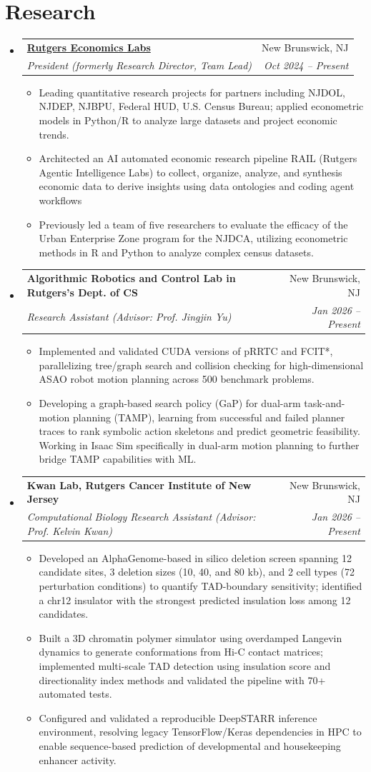 \documentclass[letterpaper,11pt]{article}
\makeatletter
\newcommand{\resumeItem}[1]{
  \item\small{
    {#1 \vspace{-2pt}}
  }
}
\newcommand{\resumeSubheading}[4]{
  \vspace{-2pt}\item
    \begin{tabular*}{0.97\textwidth}[t]{l@{\extracolsep{\fill}}r}
      \textbf{#1} & #2 \\
      \textit{\small#3} & \textit{\small #4} \\
    \end{tabular*}\vspace{-7pt}
}
\newcommand{\resumeSubHeadingListStart}{\begin{itemize}[leftmargin=0.15in, label={}]}
\newcommand{\resumeSubHeadingListEnd}{\end{itemize}}
\newcommand{\resumeItemListStart}{\begin{itemize}}
\newcommand{\resumeItemListEnd}{\end{itemize}\vspace{-5pt}}
\makeatother
\begin{document}
\section{Research}
  \resumeSubHeadingListStart
  \resumeSubheading
      {\href{https://rutgerseconomics.org}{Rutgers Economics Labs}}{New Brunswick, NJ}
      {President (formerly Research Director, Team Lead)}{Oct 2024 -- Present}
      \resumeItemListStart
        \resumeItem{Leading quantitative research projects for partners including NJDOL, NJDEP, NJBPU, Federal HUD, U.S. Census Bureau; applied econometric models in Python/R to analyze large datasets and project economic trends.}
        \resumeItem{Architected an AI automated economic research pipeline RAIL (Rutgers Agentic Intelligence Labs) to collect, organize, analyze, and synthesis economic data to derive insights using data ontologies and coding agent workflows}
        \resumeItem{Previously led a team of five researchers to evaluate the efficacy of the Urban Enterprise Zone program for the NJDCA, utilizing econometric methods in R and Python to analyze complex census datasets.}
      \resumeItemListEnd
    \resumeSubheading
      {Algorithmic Robotics and Control Lab in Rutgers's Dept. of CS}{New Brunswick, NJ}
      {Research Assistant (Advisor: Prof. Jingjin Yu)}{Jan 2026 -- Present}
      \resumeItemListStart
        \resumeItem{Implemented and validated CUDA versions of pRRTC and FCIT*, parallelizing tree/graph search and collision checking for high-dimensional ASAO robot motion planning across 500 benchmark problems.}
        \resumeItem{Developing a graph-based search policy (GaP) for dual-arm task-and-motion planning (TAMP), learning from successful and failed planner traces to rank symbolic action skeletons and predict geometric feasibility. Working in Isaac Sim specifically in dual-arm motion planning to further bridge TAMP capabilities with ML.}
      \resumeItemListEnd
    \resumeSubheading
        {Kwan Lab, Rutgers Cancer Institute of New Jersey}{New Brunswick, NJ}
        {Computational Biology Research Assistant (Advisor: Prof. Kelvin Kwan)}{Jan 2026 -- Present}
        \resumeItemListStart
            \resumeItem{Developed an AlphaGenome-based in silico deletion screen spanning 12 candidate sites, 3 deletion sizes (10, 40, and 80 kb), and 2 cell types (72 perturbation conditions) to quantify TAD-boundary sensitivity; identified a chr12 insulator with the strongest predicted insulation loss among 12 candidates.}
            \resumeItem{Built a 3D chromatin polymer simulator using overdamped Langevin  dynamics to generate conformations from Hi-C contact matrices; implemented multi-scale TAD detection using insulation score and directionality index methods and validated the pipeline with 70+ automated tests.}
            \resumeItem{Configured and validated a reproducible DeepSTARR inference environment, resolving legacy TensorFlow/Keras dependencies in HPC to enable sequence-based prediction of developmental and housekeeping enhancer activity.}
    \resumeItemListEnd
  \resumeSubHeadingListEnd
\end{document}
